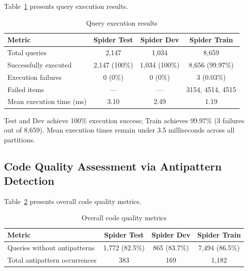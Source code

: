 \documentclass[print]{einformatica}
\begin{document}
Table~\ref{tab:execution} presents query execution results.

\begin{table}[ht]
    \caption{Query execution results}
    \label{tab:execution}
    \centering
    \footnotesize
    \begin{tabular}{lccc}
        \toprule
        \textbf{Metric} & \textbf{Spider Test} & \textbf{Spider Dev} & \textbf{Spider Train} \\
        \midrule
        Total queries & 2,147 & 1,034 & 8,659 \\
        Successfully executed & 2,147 (100\%) & 1,034 (100\%) & 8,656 (99.97\%) \\
        Execution failures & 0 (0\%) & 0 (0\%) & 3 (0.03\%) \\
        Failed items & --- & --- & 3154, 4514, 4515 \\
        Mean execution time (ms) & 3.10 & 2.49 & 1.19 \\
        \bottomrule
    \end{tabular}
\end{table}

Test and Dev achieve 100\% execution success; Train achieves 99.97\% (3 failures out of 8,659). Mean execution times remain under 3.5 milliseconds across all partitions.

\subsection{Code Quality Assessment via Antipattern Detection}\label{sec:antipattern_results}

Table~\ref{tab:antipatterns_overall} presents overall code quality metrics.

\begin{table}[ht]
    \caption{Overall code quality metrics}
    \label{tab:antipatterns_overall}
    \centering
    \footnotesize
    \begin{tabular}{lccc}
        \toprule
        \textbf{Metric} & \textbf{Spider Test} & \textbf{Spider Dev} & \textbf{Spider Train} \\
        \midrule
        Queries without antipatterns & 1,772 (82.5\%) & 865 (83.7\%) & 7,494 (86.5\%) \\
        Total antipattern occurrences & 383 & 169 & 1,182 \\
        \bottomrule
    \end{tabular}
\end{table}
\end{document}

